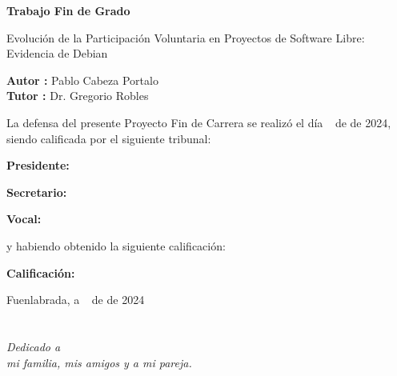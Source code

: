 \documentclass[a4paper, 12pt]{book}
\begin{document}
\vspace{-4cm}
\begin{center}
\LARGE
\textbf{Trabajo Fin de Grado}

\vspace{1cm}
\large
Evolución de la Participación Voluntaria en Proyectos de Software Libre:
Evidencia de Debian

\vspace{1cm}
\large
\textbf{Autor :} Pablo Cabeza Portalo \\
\textbf{Tutor :} Dr. Gregorio Robles

\end{center}

\vspace{1cm}
La defensa del presente Proyecto Fin de Carrera se realizó el día \qquad$\;\,$ de \qquad\qquad\qquad\qquad \newline de 2024, siendo calificada por el siguiente tribunal:


\vspace{0.5cm}
\textbf{Presidente:}

\vspace{1.2cm}
\textbf{Secretario:}

\vspace{1.2cm}
\textbf{Vocal:}


\vspace{1.2cm}
y habiendo obtenido la siguiente calificación:

\vspace{1cm}
\textbf{Calificación:}


\vspace{1cm}
\begin{flushright}
Fuenlabrada, a \qquad$\;\,$ de \qquad\qquad\qquad\qquad de 2024
\end{flushright}


\chapter*{}
\begin{flushright}
\textit{Dedicado a \\
mi familia, mis amigos y a mi pareja.}
\end{flushright}

\end{document}
